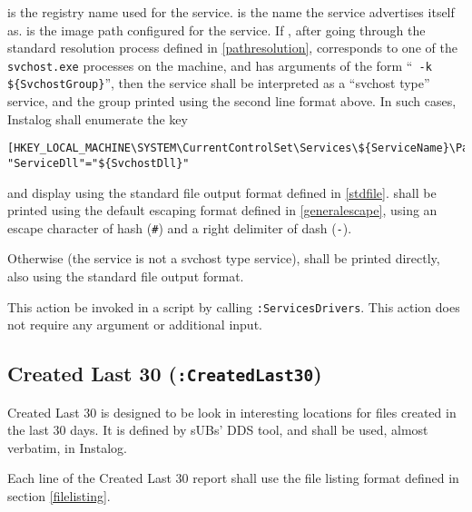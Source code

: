  is the registry name used for the service. 
is the name the service advertises itself as.  is the image path
configured for the service. If , after going through the standard
resolution process defined in \ref{pathresolution}, corresponds to one of the
\verb|svchost.exe| processes on the machine, and has arguments of the form
``\verb| -k ${SvchostGroup}|'', then the service shall be interpreted as a
``svchost type'' service, and the group printed using the second line format
above. In such cases, Instalog shall enumerate the key
\begin{verbatim}
[HKEY_LOCAL_MACHINE\SYSTEM\CurrentControlSet\Services\${ServiceName}\Parameters]
"ServiceDll"="${SvchostDll}"
\end{verbatim}
and display  using the standard file output format defined in
\ref{stdfile}.  shall be printed using the default escaping
format defined in \ref{generalescape}, using an escape character of hash
(\verb|#|) and a right delimiter of dash (\verb|-|).

Otherwise (the service is not a svchost type service),  shall be
printed directly, also using the standard file output format.

This action be invoked in a script by calling \verb|:ServicesDrivers|.  This
action does not require any argument or additional input.

\subsection{Created Last 30 (\texttt{:CreatedLast30})}
Created Last 30 is designed to be look in interesting locations for files
created in the last 30 days. It is defined by sUBs' DDS tool, and shall be used,
almost verbatim, in Instalog.

Each line of the Created Last 30 report shall use the file listing format
defined in section \ref{filelisting}.

